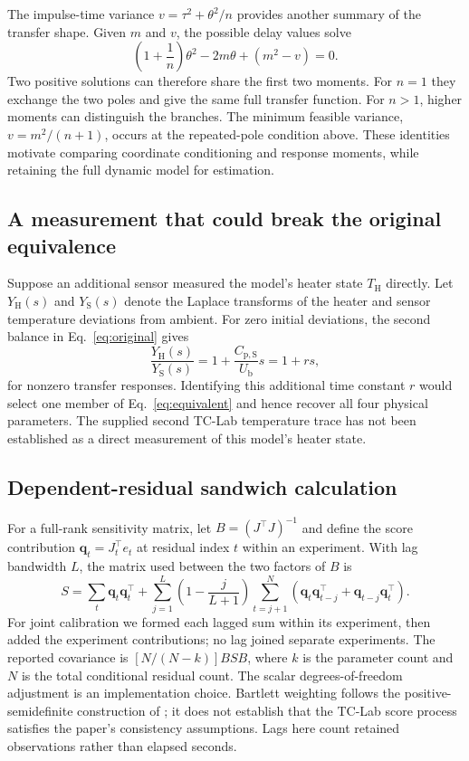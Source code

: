 \documentclass[11pt]{article}
\newcommand{\Ub}{U_{\mathrm b}}
\newcommand{\CpS}{C_{\mathrm{p,S}}}
\begin{document}
The impulse-time variance $v=\tau^2+\theta^2/n$ provides another summary of the
transfer shape. Given $m$ and $v$, the possible delay values solve
\[
 \left(1+\frac1n\right)\theta^2-2m\theta+(m^2-v)=0.
\]
Two positive solutions can therefore share the first two moments. For $n=1$
they exchange the two poles and give the same full transfer function. For
$n>1$, higher moments can distinguish the branches. The minimum feasible
variance, $v=m^2/(n+1)$, occurs at the repeated-pole condition above. These
identities motivate comparing coordinate conditioning and response moments,
while retaining the full dynamic model for estimation.

\subsection{A measurement that could break the original equivalence}
Suppose an additional sensor measured the model's heater state $T_{\mathrm H}$
directly. Let $Y_{\mathrm H}(s)$ and $Y_{\mathrm S}(s)$ denote the Laplace
transforms of the heater and sensor temperature deviations from ambient.
For zero initial deviations, the second balance in Eq.~\eqref{eq:original} gives
\[
 \frac{Y_{\mathrm H}(s)}{Y_{\mathrm S}(s)}
 =1+\frac{\CpS}{\Ub}s=1+rs,
\]
for nonzero transfer responses. Identifying this additional time constant $r$ would select one
member of Eq.~\eqref{eq:equivalent} and hence recover all four physical
parameters. The supplied
second TC-Lab temperature trace has not been established as a direct
measurement of this model's heater state.

\subsection{Dependent-residual sandwich calculation}
For a full-rank sensitivity matrix, let $B=(J^\top J)^{-1}$ and define the
score contribution $\bm q_t=J_t^\top e_t$ at residual index $t$ within an
experiment. With lag bandwidth $L$, the matrix used between the two factors
of $B$ is
\[
 S=\sum_t\bm q_t\bm q_t^\top+
 \sum_{j=1}^{L}\left(1-\frac{j}{L+1}\right)
 \sum_{t=j+1}^{N}
 \left(\bm q_t\bm q_{t-j}^\top+\bm q_{t-j}\bm q_t^\top\right).
\]
For joint calibration we formed each lagged sum within its experiment, then
added the experiment contributions; no lag joined separate experiments. The
reported covariance is $[N/(N-k)]BSB$, where $k$ is the parameter count and
$N$ is the total conditional residual count. The scalar degrees-of-freedom
adjustment is an implementation choice. Bartlett weighting follows the
positive-semidefinite construction of \citet{newey-1987-simple}; it does not
establish that the TC-Lab score process satisfies the paper's consistency
assumptions. Lags here count retained observations rather than elapsed seconds.
\end{document}
